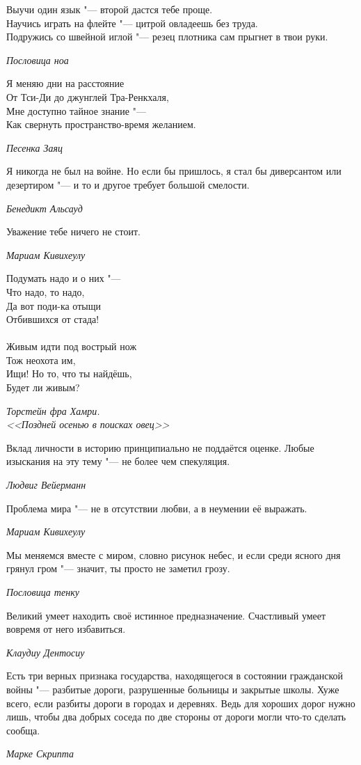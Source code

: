 \documentclass[a4paper,10pt]{book}
\newcommand{\mulang}[3]{#2}%
\begin{document}
\epigraph{Выучи один язык "--- второй дастся тебе проще.\\
Научись играть на флейте "--- цитрой овладеешь без труда.\\
Подружись со швейной иглой "--- резец плотника сам прыгнет в твои руки.}
{\textit{Пословица ноа}}

\epigraph{Я меняю дни на расстояние\\
От Тси-Ди до джунглей Тра-Ренкхаля,\\
Мне доступно тайное знание "---\\
Как свернуть пространство-время желанием.}
{\textit{Песенка Заяц}}

\epigraph{Я никогда не был на войне.
Но если бы пришлось, я стал бы диверсантом или дезертиром "---
и то и другое требует большой смелости.}
{\textit{Бенедикт Альсауд}}

\epigraph{\mulang{}{Уважение тебе ничего не стоит.}{Respect costs you nothing.}}
{\textit{Мариам Кивихеулу}}

\epigraph{Подумать надо и о них "---\\
Что надо, то надо,\\
Да вот поди-ка отыщи\\
Отбившихся от стада!\\
~\\
Живым идти под вострый нож\\
Тож неохота им,\\
Ищи! Но то, что ты найдёшь,\\
Будет ли живым?}
{\textit{Торстейн фра Хамри.\\
<<Поздней осенью в поисках овец>>}}

\epigraph{Вклад личности в историю принципиально не поддаётся оценке.
Любые изыскания на эту тему "--- не более чем спекуляция.}
{\textit{Людвиг Вейерманн}}

\epigraph{Проблема мира "--- не в отсутствии любви, а в неумении её выражать.}
{\textit{Мариам Кивихеулу}}

\epigraph{Мы меняемся вместе с миром, словно рисунок небес, 
и если среди ясного дня грянул гром "--- значит, ты просто не заметил грозу.}
{\textit{Пословица тенку}}

\epigraph{Великий умеет находить своё истинное предназначение. 
Счастливый умеет вовремя от него избавиться.}
{\textit{Клаудиу Дентосиу}}

\epigraph{Есть три верных признака государства, 
находящегося в состоянии гражданской войны "--- 
разбитые дороги, разрушенные больницы и закрытые школы.
Хуже всего, если разбиты дороги в городах и деревнях. Ведь для хороших дорог нужно лишь,
чтобы два добрых соседа по две стороны от дороги могли что-то сделать сообща.}
{\textit{Марке Скрипта}}
\end{document}

